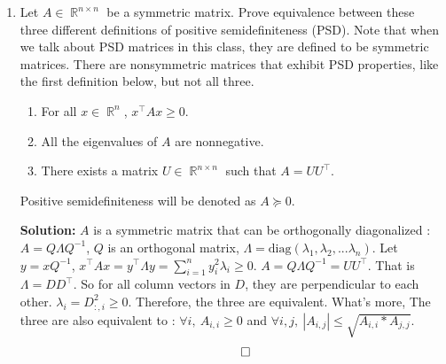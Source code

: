 \documentclass{article}
\DeclareMathOperator{\rank}{\mathrm{rank}}
\DeclareMathOperator{\R}{\mathbb{R}}
\newenvironment{solution}{\color{blue} \smallskip \textbf{Solution:}}{}
\begin{document}
\begin{enumerate}
\begin{solution}
\begin{enumerate}
        \item
        $A\R^n$ is $\text{Col}(A)$. \newline
        For any vector $v \in \R^n$, $A^\top Av \in A^\top A\R^n$: $\forall w \in \text{Null}(A)$, ($A^\top Av) \cdot w = (v^\top A^\top A)w = v^\top A^\top (A w) = \mathbf{0}$. So $A^\top Av \perp w$. That means $A^\top A\R^n \subseteq \text{Row}(A)$.
        Because $\rank (A^\top A) = \rank A$, $A^\top A\R^n = \text{Row}(A)$.

        \end{enumerate}  
        \[ \qedhere \]
    \end{solution}

    \item 
    Let $A \in \R^{n\times n}$ be a symmetric matrix.
    Prove equivalence between these three different definitions of positive semidefiniteness (PSD).
    Note that when we talk about PSD matrices in this class, they are defined to be symmetric matrices.
    There are nonsymmetric matrices that exhibit PSD properties, like the first definition below, but not all three.
    \begin{enumerate}
        \item For all $x\in\R^n$, $x^\top Ax\geq 0$.
        \item All the eigenvalues of $A$ are nonnegative.
        \item There exists a matrix $U\in\R^{n\times n}$ such that $A = UU^\top $.
    \end{enumerate}
    Positive semidefiniteness will be denoted as $A\succeq 0$. 
    
    \begin{solution}
        $A$ is a symmetric matrix that can be orthogonally diagonalized : $A = Q\Lambda Q^{-1}$, $Q$ is an orthogonal matrix, $\Lambda = \text{diag}(\lambda_1,\lambda_2,...\lambda_n)$.
        Let $y = xQ^{-1}$, $x^\top Ax = y^\top \Lambda y = \sum_{i=1}^{n}y_i^2 \lambda_i \geq 0$. $A=Q\Lambda Q^{-1}=UU^\top$. That is $\Lambda=DD^\top$. So for all column vectors in $D$, they are perpendicular to each other. $\lambda_i=D_{:,i}^2 \geq 0$. Therefore, the three are equivalent. \newline
        What's more, The three are also equivalent to : $\forall i,\  A_{i, i} \geq 0$ and $\forall i, j,\  | A_{i,j} | \leq \sqrt{A_{i, i} * A_{j, j}}$.
        \[ \qedhere \]
    \end{solution}


\end{enumerate}
\end{document}
